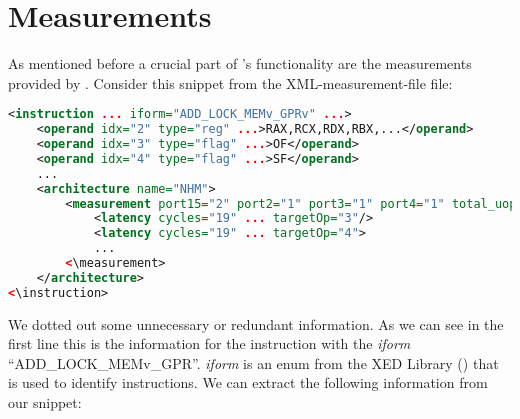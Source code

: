 \section{Measurements}
\label{sec:measurements}

As mentioned before a crucial part of \suaca's functionality are the measurements provided by \cite{Andreas}. Consider this snippet from the XML-measurement-file file:


\begin{lstlisting}[language=XML, basicstyle=\ttfamily\scriptsize, breaklines=false]
<instruction ... iform="ADD_LOCK_MEMv_GPRv" ...>
    <operand idx="2" type="reg" ...>RAX,RCX,RDX,RBX,...</operand>
    <operand idx="3" type="flag" ...>OF</operand>
    <operand idx="4" type="flag" ...>SF</operand>
    ...
    <architecture name="NHM">
        <measurement port15="2" port2="1" port3="1" port4="1" total_uops="5">
            <latency cycles="19" ... targetOp="3"/>
            <latency cycles="19" ... targetOp="4">
            ...
        <\measurement>
    </architecture>
<\instruction>
\end{lstlisting}

We dotted out some unnecessary or redundant information. As we can see in the first line this is the information for the instruction with the \emph{iform} ``ADD\_LOCK\_MEMv\_GPR''. \emph{iform} is an enum from the XED Library (\cite{xed}) that is used to identify instructions. We can extract the following information from our snippet:

